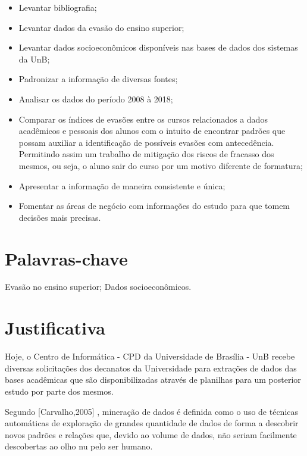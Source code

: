 \begin{enumerate} 
    \begin{itemize}
        \item   Levantar bibliografia;
        \item   Levantar dados da evasão do ensino superior;
        \item   Levantar dados socioeconômicos disponíveis nas bases de dados dos sistemas da UnB;
        \item	Padronizar a informação de diversas fontes;
        \item	Analisar os dados do período 2008 à 2018;
        \item   Comparar os índices de evasões entre os cursos relacionados a dados acadêmicos e pessoais dos alunos com o intuito  de encontrar padrões que possam auxiliar a identificação de possíveis evasões com antecedência. Permitindo assim um trabalho de mitigação dos riscos de fracasso dos mesmos, ou seja, o aluno sair do curso por um motivo diferente de formatura;
        \item	Apresentar a informação de maneira consistente e única;
        \item	Fomentar as áreas de negócio com informações do estudo para que tomem decisões mais precisas.
        
    \end{itemize}%
\end{enumerate}%

\section{Palavras-chave}%
Evasão no ensino superior; Dados socioeconômicos.


\section{Justificativa}%
Hoje, o Centro de Informática - CPD da Universidade de Brasília - UnB recebe diversas solicitações dos decanatos da Universidade para  extrações de dados das bases acadêmicas que são disponibilizadas através de planilhas para um posterior estudo por parte dos mesmos.

Segundo [Carvalho,2005]%
, mineração de dados é definida  como o uso de técnicas automáticas de exploração de grandes quantidade de dados de forma a descobrir novos padrões e relações que, devido ao volume de dados, não seriam facilmente descobertas ao olho nu pelo ser humano.


